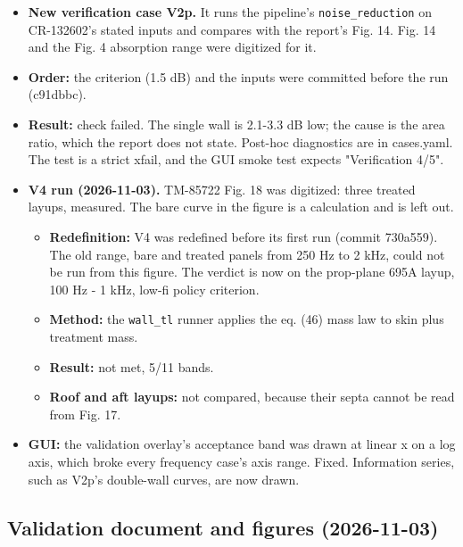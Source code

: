 \documentclass[10pt,a4paper]{article}
\begin{document}
\begin{itemize}
\item \textbf{New verification case V2p.} It runs the pipeline's \texttt{noise\_\allowbreak{}reduction} on CR-132602's stated inputs and compares with the report's Fig. 14. Fig. 14 and the Fig. 4 absorption range were digitized for it.
\item \textbf{Order:} the criterion (1.5 dB) and the inputs were committed before the run (c91dbbc).
\item \textbf{Result:} check failed. The single wall is 2.1-3.3 dB low; the cause is the area ratio, which the report does not state. Post-hoc diagnostics are in cases.yaml. The test is a strict xfail, and the GUI smoke test expects "Verification 4/5".
\item \textbf{V4 run (2026-11-03).} TM-85722 Fig. 18 was digitized: three treated layups, measured. The bare curve in the figure is a calculation and is left out.
\begin{itemize}
\item \textbf{Redefinition:} V4 was redefined before its first run (commit 730a559). The old range, bare and treated panels from 250 Hz to 2 kHz, could not be run from this figure. The verdict is now on the prop-plane 695A layup, 100 Hz - 1 kHz, low-fi policy criterion.
\item \textbf{Method:} the \texttt{wall\_\allowbreak{}tl} runner applies the eq. (46) mass law to skin plus treatment mass.
\item \textbf{Result:} not met, 5/11 bands.
\item \textbf{Roof and aft layups:} not compared, because their septa cannot be read from Fig. 17.
\end{itemize}
\item \textbf{GUI:} the validation overlay's acceptance band was drawn at linear x on a log axis, which broke every frequency case's axis range. Fixed. Information series, such as V2p's double-wall curves, are now drawn.
\end{itemize}

\subsection*{Validation document and figures (2026-11-03)}
\end{document}
